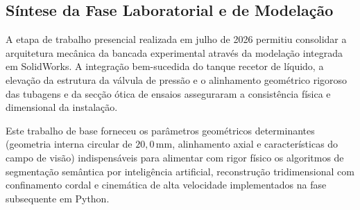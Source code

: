 \subsection{Síntese da Fase Laboratorial e de Modelação}
\label{subsec:sintese_laboratorio}

A etapa de trabalho presencial realizada em julho de 2026 permitiu consolidar a arquitetura mecânica da bancada experimental através da modelação integrada em SolidWorks\textregistered{}. A integração bem-sucedida do tanque recetor de líquido, a elevação da estrutura da válvula de pressão e o alinhamento geométrico rigoroso das tubagens e da secção ótica de ensaios asseguraram a consistência física e dimensional da instalação. 

Este trabalho de base forneceu os parâmetros geométricos determinantes (geometria interna circular de $20{,}0\,\mathrm{mm}$, alinhamento axial e características do campo de visão) indispensáveis para alimentar com rigor físico os algoritmos de segmentação semântica por inteligência artificial, reconstrução tridimensional com confinamento cordal e cinemática de alta velocidade implementados na fase subsequente em Python.
